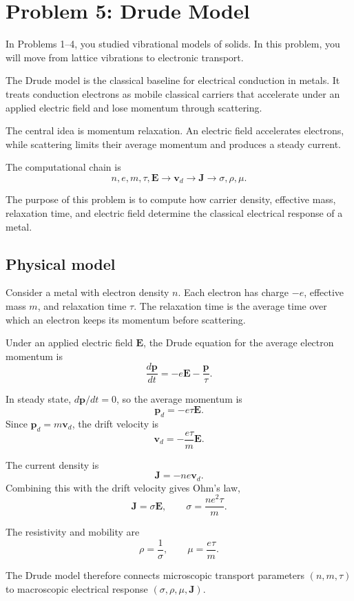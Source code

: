 \section{Problem 5: Drude Model}

In Problems 1--4, you studied vibrational models of solids. In this problem, you will move from lattice vibrations to electronic transport.

The Drude model is the classical baseline for electrical conduction in metals. It treats conduction electrons as mobile classical carriers that accelerate under an applied electric field and lose momentum through scattering.

The central idea is momentum relaxation. An electric field accelerates electrons, while scattering limits their average momentum and produces a steady current.

The computational chain is
\[
n,e,m,\tau,\mathbf E
\longrightarrow
\mathbf v_d
\longrightarrow
\mathbf J
\longrightarrow
\sigma,\rho,\mu.
\]

The purpose of this problem is to compute how carrier density, effective mass, relaxation time, and electric field determine the classical electrical response of a metal.

\subsection{Physical model}

Consider a metal with electron density \(n\). Each electron has charge \(-e\), effective mass \(m\), and relaxation time \(\tau\). The relaxation time is the average time over which an electron keeps its momentum before scattering.

Under an applied electric field \(\mathbf E\), the Drude equation for the average electron momentum is
\[
\frac{d\mathbf p}{dt}
=
-e\mathbf E
-
\frac{\mathbf p}{\tau}.
\]

In steady state, \(d\mathbf p/dt=0\), so the average momentum is
\[
\mathbf p_d=-e\tau\mathbf E.
\]
Since \(\mathbf p_d=m\mathbf v_d\), the drift velocity is
\[
\mathbf v_d=-\frac{e\tau}{m}\mathbf E.
\]

The current density is
\[
\mathbf J=-ne\mathbf v_d.
\]
Combining this with the drift velocity gives Ohm's law,
\[
\mathbf J=\sigma\mathbf E,
\qquad
\sigma=\frac{ne^2\tau}{m}.
\]

The resistivity and mobility are
\[
\rho=\frac{1}{\sigma},
\qquad
\mu=\frac{e\tau}{m}.
\]

The Drude model therefore connects microscopic transport parameters \((n,m,\tau)\) to macroscopic electrical response \((\sigma,\rho,\mu,\mathbf J)\).

